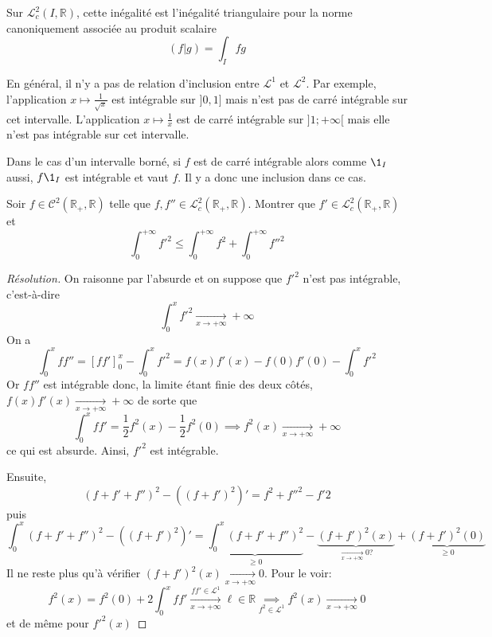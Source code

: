 \begin{rem}
    Sur $\mathcal L^2_c(I, \mathbb R)$, cette inégalité est l'inégalité triangulaire pour la norme canoniquement associée au produit scalaire \[
        (f | g)=\int_Ifg
    \]
\end{rem}

\begin{rem}
    En général, il n'y a pas de relation d'inclusion entre $\mathcal L^1$ et $\mathcal L^2$. Par exemple, l'application $x\longmapsto \frac1{\sqrt x}$ est intégrable sur $]0, 1]$ mais n'est pas de carré intégrable sur cet intervalle. L'application $x\longmapsto\frac1x$ est de carré intégrable sur $]1; +\infty[$ mais elle n'est pas intégrable sur cet intervalle.

    Dans le cas d'un intervalle borné, si $f$ est de carré intégrable alors comme $\1_I$ aussi, $f\1_I$ est intégrable et vaut $f$. Il y a donc une inclusion dans ce cas.
\end{rem}

\begin{exo}
    Soir $f\in\mathcal C^2(\mathbb R_+, \mathbb R)$ telle que $f,f''\in\mathcal L^2_c(\mathbb R_+, \mathbb R)$. Montrer que $f'\in\mathcal L^2_c(\mathbb R_+, \mathbb R)$ et \[
        \int_0^{+\infty}f'^2\leq \int_0^{+\infty}f^2+\int_0^{+\infty}f''^2
    \]
\end{exo}

\begin{proof}[Résolution] On raisonne par l'absurde et on suppose que $f'^2$ n'est pas intégrable, c'est-à-dire \[
    \int_0^xf'^2\xrightarrow[x\to+\infty]{}+\infty
\]
On a \[
    \int_0^xff''=[ff']_0^x-\int_0^xf'^2=f(x)f'(x)-f(0)f'(0)-\int_0^xf'^2
\]
Or $ff''$ est intégrable donc, la limite étant finie des deux côtés, $f(x)f'(x)\xrightarrow[x\to+\infty]{}+\infty$ de sorte que \[
    \int_0^xff'=\frac12f^2(x)-\frac12f^2(0) \implies f^2(x)\xrightarrow[x\to+\infty]{}+\infty
\]
ce qui est absurde. Ainsi, $f'^2$ est intégrable.

Ensuite, \[
    (f+f'+f'')^2-((f+f')^2)'=f^2+f''^2-f'2
\]
puis \[
    \int_0^x(f+f'+f'')^2-((f+f')^2)'=\underbrace{\int_0^x(f+f'+f'')^2}_{\geq 0}-\underbrace{(f+f')^2(x)}_{\xrightarrow[x\to+\infty]{}0?}+\underbrace{(f+f')^2(0)}_{\geq 0}
\]
Il ne reste plus qu'à vérifier $(f+f')^2(x)\xrightarrow[x\to+\infty]{}0$. Pour le voir: \[
    f^2(x)=f^2(0)+2\int_0^xff'\xrightarrow[x\to+\infty]{ff'\in\mathcal L^1}\ell\in\mathbb R\underset{f^2\in\mathcal L^1}\implies f^2(x)\xrightarrow[x\to+\infty]{}0
\]
et de même pour $f'^2(x)$
\end{proof}


